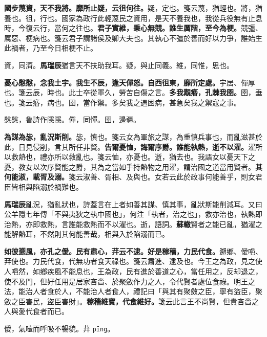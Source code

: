 \textbf{國步蔑資，天不我將。靡所止疑，云徂何往。}{\footnotesize 疑，定也。箋云蔑，猶輕也。將，猶養也。徂，行也。國家為政行此輕蔑民之資用，是天不養我也，我從兵役無有止息時，今復云行，當何之往也。}\textbf{君子實維，秉心無競。誰生厲階，至今為梗。}{\footnotesize 競彊、厲惡、梗病也。箋云君子謂諸侯及卿大夫也。其執心不彊於善而好以力爭，誰始生此禍者，乃至今日相梗不止。}

\begin{quoting}資，同濟。\textbf{馬瑞辰}猶言天不扶助我耳。疑，與止同義。維，同惟，思也。\end{quoting}

\textbf{憂心慇慇，念我土宇。我生不辰，逢天僤怒。自西徂東，靡所定處。}{\footnotesize 宇居、僤厚也。箋云辰，時也。此士卒從軍久，勞苦自傷之言。}\textbf{多我覯痻，孔棘我圉。}{\footnotesize 圉，垂也。箋云痻，病也。圉，當作禦。多矣我之遇困病，甚急矣我之禦寇之事。}

\begin{quoting}慇慇，魯詩作隱隱。僤，同憚。圉，邊疆。\end{quoting}

\textbf{為謀為毖，亂況斯削。}{\footnotesize 毖，慎也。箋云女為軍旅之謀，為重慎兵事也，而亂滋甚於此，日見侵削，言其所任非賢。}\textbf{告爾憂恤，誨爾序爵。誰能執熱，逝不以濯。}{\footnotesize 濯所以救熱也，禮亦所以救亂也。箋云恤，亦憂也。逝，猶去也。我語女以憂天下之憂，教女以次序賢能之爵，其為之當如手持熱物之用濯，謂治國之道當用賢者。}\textbf{其何能淑，載胥及溺。}{\footnotesize 箋云淑善、胥相、及與也。女若云此於政事何能善乎，則女君臣皆相與陷溺於禍難也。}

\begin{quoting}\textbf{馬瑞辰}亂況，猶亂狀也，詩蓋言在上者如善其謀、慎其事，亂狀斯能削減耳。又曰公羊隱七年傳「不與夷狄之執中國也」，何注「執者，治之也」，救亦治也，執熱即治熱，亦即救熱，言誰能救熱而不以濯也。逝，語詞。\textbf{蘇轍}賢者之能已亂，猶濯之能解熱耳，不然則其何能善哉，相與入於陷溺而已。\end{quoting}

\textbf{如彼遡風，亦孔之僾。民有肅心，荓云不逮。好是稼穡，力民代食。}{\footnotesize 遡鄉、僾唈、荓使也。力民代食，代無功者食天祿也。箋云肅進、逮及也。今王之為政，見之使人唈然，如鄉疾風不能息也，王為政，民有進於善道之心，當任用之，反却退之，使不及門，但好任用是居家吝嗇、於聚斂作力之人，令代賢者處位食祿。明王之法，能治人者食於人，不能治人者食人，禮記曰「與其有聚斂之臣，寧有盜臣，聚斂之臣害民，盜臣害財」。}\textbf{稼穡維寶，代食維好。}{\footnotesize 箋云此言王不尚賢，但貴吝嗇之人與愛代食者而已。}

\begin{quoting}僾，氣噎而呼吸不暢貌。荓 \texttt{pīng}。\end{quoting}

